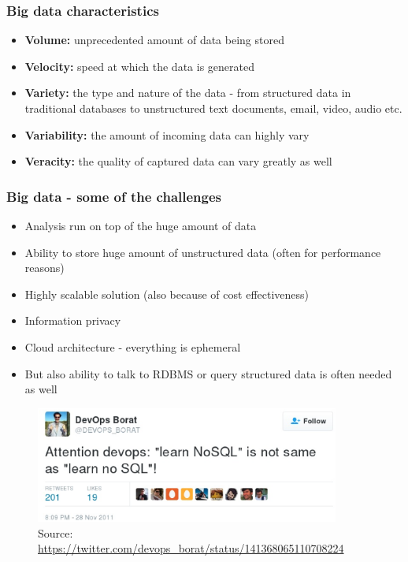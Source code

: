 \documentclass[10pt,utf8]{beamer}
\begin{document}
\begin{frame}
	\frametitle{Big data characteristics}
	\begin{itemize}
		\pause
		\item \textbf{Volume:} unprecedented amount of data being stored
		\pause
		\item \textbf{Velocity:} speed at which the data is generated
		\pause
		\item \textbf{Variety:} the type and nature of the data - from structured data in traditional databases to unstructured text documents, email, video, audio etc.
		\pause
		\item \textbf{Variability:} the amount of incoming data can highly vary
		\pause
		\item \textbf{Veracity:} the quality of captured data can vary greatly as well
	\end{itemize}
\end{frame}

\begin{frame}
	\frametitle{Big data - some of the challenges}
	 {
		\begin{itemize}
			\item Analysis run on top of the huge amount of data
			\item Ability to store huge amount of unstructured data (often for performance reasons)
			\item Highly scalable solution (also because of cost effectiveness)
			\item Information privacy
			\item Cloud architecture - everything is ephemeral
			\item But also ability  to talk to RDBMS or query structured data is often needed as well
		\end{itemize}
	}
	 {
		\begin{figure}
			\centering
			\includegraphics[width=10cm]{./img/borat_learn_nosql.eps}
			\caption{\tiny{Source: \url{https://twitter.com/devops_borat/status/141368065110708224}}}
		\end{figure}
	}
\end{frame}
\end{document}
